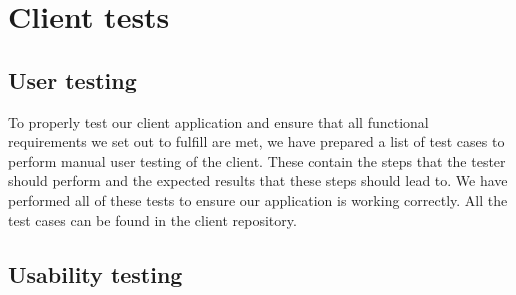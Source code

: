 \section{Client tests}

\subsection{User testing}

To properly test our client application and ensure that all functional requirements we set out to fulfill are met, we have prepared a list of test cases to perform manual user testing of the client. These contain the steps that the tester should perform and the expected results that these steps should lead to. We have performed all of these tests to ensure our application is working correctly. All the test cases can be found in the client repository.

\subsection{Usability testing}

